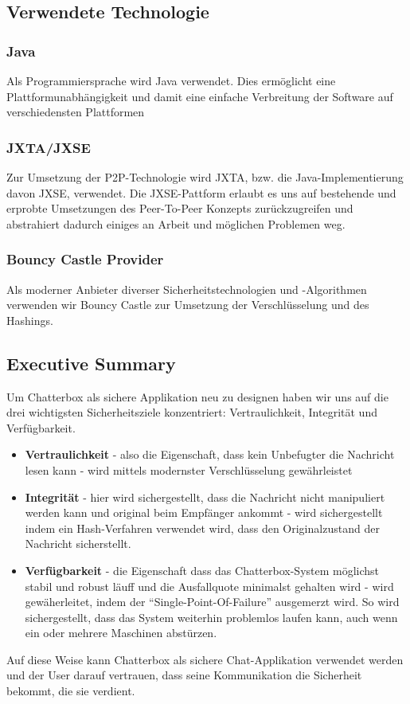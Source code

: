 \documentclass[12pt,a4paper,titlepage,oneside]{scrartcl}
\begin{document}
\newpage
\subsection{Verwendete Technologie}

\subsubsection{Java}
Als Programmiersprache wird Java verwendet. Dies erm\"{o}glicht eine Plattformunabh\"{a}ngigkeit und damit eine einfache Verbreitung der Software auf verschiedensten Plattformen

\subsubsection{JXTA/JXSE}
Zur Umsetzung der P2P-Technologie wird JXTA, bzw. die Java-Implementierung davon JXSE, verwendet. Die JXSE-Pattform erlaubt es uns auf bestehende und erprobte Umsetzungen des Peer-To-Peer Konzepts zur\"{u}ckzugreifen und abstrahiert dadurch einiges an Arbeit und m\"{o}glichen Problemen weg.

\subsubsection{Bouncy Castle Provider}
Als moderner Anbieter diverser Sicherheitstechnologien und -Algorithmen verwenden wir Bouncy Castle zur Umsetzung der Verschl\"{u}sselung und des Hashings.


\subsection{Executive Summary}
Um Chatterbox als sichere Applikation neu zu designen haben wir uns auf die drei wichtigsten Sicherheitsziele konzentriert: Vertraulichkeit, Integrit\"at und Verf\"{u}gbarkeit.
\begin{itemize}
\item \textbf{Vertraulichkeit} - also die Eigenschaft, dass kein Unbefugter die Nachricht lesen kann - wird mittels modernster Verschl\"{u}sselung gew\"{a}hrleistet
\item \textbf{Integrit\"{a}t} - hier wird sichergestellt, dass die Nachricht nicht manipuliert werden kann und original beim Empf\"{a}nger ankommt - wird sichergestellt indem ein Hash-Verfahren verwendet wird, dass den Originalzustand der Nachricht  sicherstellt.
\item \textbf{Verf\"{u}gbarkeit} - die Eigenschaft dass das Chatterbox-System m\"{o}glichst stabil und robust l\"{a}uff und die Ausfallquote minimalst gehalten wird - wird gew\"{a}herleitet, indem der ``Single-Point-Of-Failure'' ausgemerzt wird. So wird sichergestellt, dass das System weiterhin problemlos laufen kann, auch wenn ein oder mehrere Maschinen abst\"{u}rzen.
\end{itemize}
Auf diese Weise kann Chatterbox als sichere Chat-Applikation verwendet werden und der User darauf vertrauen, dass seine Kommunikation die Sicherheit bekommt, die sie verdient.

%
%
\end{document}
